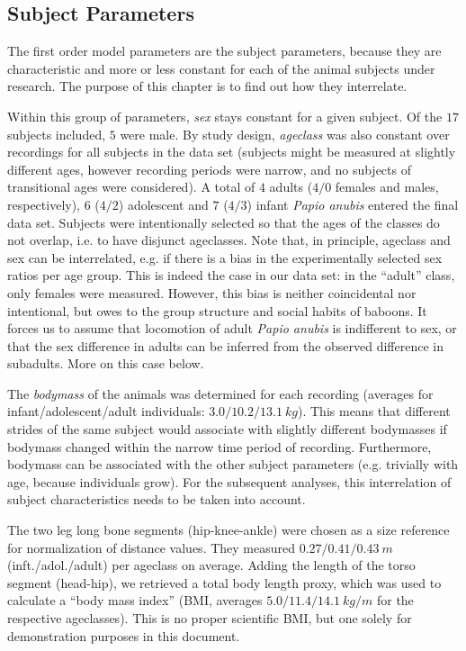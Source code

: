 \clearpage
\subsection{Subject Parameters}
\label{sec:orgb7153d3}
The first order model parameters are the subject parameters, because they are characteristic and more or less constant for each of the animal subjects under research.
The purpose of this chapter is to find out how they interrelate.

Within this group of parameters, \emph{sex} stays constant for a given subject.
Of the \(17\) subjects included, \(5\) were male.
By study design, \emph{ageclass} was also constant over recordings for all subjects in the data set (subjects might be measured at slightly different ages, however recording periods were narrow, and no subjects of transitional ages were considered).
A total of
\(4\) adults (\(4/0\) females and males, respectively),
\(6\) (\(4/2\)) adolescent
and \(7\) (\(4/3\)) infant
\emph{Papio anubis} entered the final data set.
Subjects were intentionally selected so that the ages of the classes do not overlap, i.e. to have disjunct ageclasses.
Note that, in principle, ageclass and sex can be interrelated, e.g. if there is a bias in the experimentally selected sex ratios per age group.
This is indeed the case in our data set: in the ``adult'' class, only females were measured.
However, this bias is neither coincidental nor intentional, but owes to the group structure and social habits of baboons.
It forces us to assume that locomotion of adult \emph{Papio anubis} is indifferent to sex, or that the sex difference in adults can be inferred from the observed difference in subadults.
More on this case below.


The \emph{bodymass} of the animals was determined for each recording (averages for infant/adolescent/adult individuals: \(3.0/10.2/13.1\ kg\)).
This means that different strides of the same subject would associate with slightly different bodymasses if bodymass changed within the narrow time period of recording.
Furthermore, bodymass can be associated with the other subject parameters (e.g. trivially with age, because individuals grow).
For the subsequent analyses, this interrelation of subject characteristics needs to be taken into account.

The two leg long bone segments (hip-knee-ankle) were chosen as a size reference for normalization of distance values. They measured \(0.27/0.41/0.43\ m\) (inft./adol./adult) per ageclass on average.
Adding the length of the torso segment (head-hip), we retrieved a total body length proxy, which was used to calculate a ``body mass index'' (BMI, averages \(5.0/11.4/14.1\ kg/m\) for the respective ageclasses).
This is no proper scientific BMI, but one solely for demonstration purposes in this document.
\medskip

